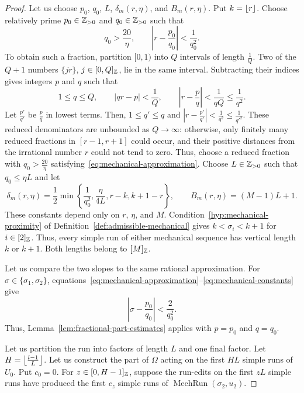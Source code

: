 \begin{proof}
 Let us choose $p_0$, $q_0$, $L$, $\delta_m(r,\eta)$, and $B_m(r,\eta)$.
Put $k=\left\lfloor r\right\rfloor$.
Choose relatively prime $p_0\in\mathbb Z_{>0}$ and $q_0\in\mathbb Z_{>0}$ such that
\begin{equation}\label{eq:mechanical-approximation}
 q_0>\frac{20}{\eta},\qquad |r-\frac{p_0}{q_0}|<\frac1{q_0^2}.
\end{equation}
To obtain such a fraction, partition $[0,1)$ into $Q$ intervals of length $\frac1Q$.
Two of the $Q+1$ numbers $\{jr\}$, $j\in[0,Q]_{\mathbb Z}$, lie in the same interval.
Subtracting their indices gives integers $p$ and $q$ such that
\[
 1\le q\le Q,\qquad |qr-p|<\frac1Q,\qquad
 \left|r-\frac pq\right|<\frac1{qQ}\le\frac1{q^2}.
\]
Let $\frac{p'}{q'}$ be $\frac pq$ in lowest terms. Then, $1\le q'\le q$ and $\left|r-\frac{p'}{q'}\right|<\frac1{q^2}\le\frac1{q'^2}$.
These reduced denominators are unbounded as $Q\to\infty$: otherwise, only finitely many
reduced fractions in $[r-1,r+1]$ could occur, and their positive distances from the irrational number $r$
could not tend to zero.
Thus, choose a reduced fraction with $q_0>\frac{20}{\eta}$ satisfying~\eqref{eq:mechanical-approximation}.
Choose $L\in\mathbb Z_{>0}$ such that $q_0\le\eta L$ and let
\begin{equation}\label{eq:mechanical-constants}
 \delta_m(r,\eta)=\frac12\min\left\{\frac1{q_0^2},\frac{\eta}{4L},r-k,k+1-r\right\},
 \qquad B_m(r,\eta)=(M-1)L+1.
\end{equation}
These constants depend only on $r$, $\eta$, and $M$.
Condition~\ref{hyp:mechanical-proximity} of Definition~\ref{def:admissible-mechanical} gives $k<\sigma_i<k+1$ for $i\in[2]_{\mathbb Z}$.
Thus, every simple run of either mechanical sequence has vertical length $k$ or $k+1$. Both lengths belong to $[M]_{\mathbb Z}$.

Let us compare the two slopes to the same rational approximation.
For $\sigma\in\{\sigma_1,\sigma_2\}$, equations~\eqref{eq:mechanical-approximation}--\eqref{eq:mechanical-constants} give
\[
 |\sigma-\frac{p_0}{q_0}|<\frac2{q_0^2}.
\]
Thus, Lemma~\ref{lem:fractional-part-estimates} applies with $p=p_0$ and $q=q_0$.

Let us partition the run into factors of length $L$ and one final factor.
Let $H=\left\lfloor\frac{l-1}{L}\right\rfloor$.
Let us construct the part of $\Omega$ acting on the first $HL$ simple runs of $U_0$.
Put $c_0=0$.
For $z\in[0,H-1]_{\mathbb Z}$, suppose the run-edits on the first $zL$ simple runs have
produced the first $c_z$ simple runs of $\operatorname{MechRun}(\sigma_2,u_2)$.


\end{proof}
